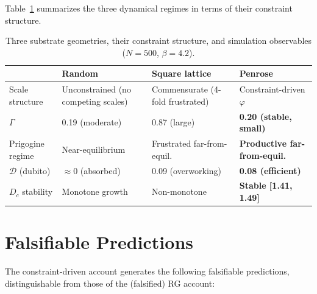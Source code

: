 \documentclass[11pt,a4paper]{article}
\theoremstyle{plain}
\theoremstyle{definition}
\newcommand{\phiGolden}{\varphi}
\begin{document}
Table~\ref{tab:regimes} summarizes the three dynamical regimes in terms
of their constraint structure.

\begin{table}[h]
\centering
\caption{Three substrate geometries, their constraint structure, and
  simulation observables ($N = 500$, $\beta = 4.2$).}
\label{tab:regimes}
\begin{tabular}{p{2.8cm}p{2.8cm}p{2.8cm}p{3.2cm}}
\toprule
& \textbf{Random} & \textbf{Square lattice} & \textbf{Penrose} \\
\midrule
Scale structure &
  Unconstrained (no competing scales) &
  Commensurate (4-fold frustrated) &
  Constraint-driven $\phiGolden$ \\[4pt]
$\Gamma$ & 0.19 (moderate) & 0.87 (large) & \textbf{0.20 (stable, small)} \\[4pt]
Prigogine regime &
  Near-equilibrium &
  Frustrated far-from-equil. &
  \textbf{Productive far-from-equil.} \\[4pt]
$\mathcal{D}$ (dubito) &
  $\approx 0$ (absorbed) &
  0.09 (overworking) &
  \textbf{0.08 (efficient)} \\[4pt]
$D_c$ stability &
  Monotone growth &
  Non-monotone &
  \textbf{Stable [1.41, 1.49]} \\
\bottomrule
\end{tabular}
\end{table}

\section{Falsifiable Predictions}
\label{sec:predictions}

The constraint-driven account generates the following falsifiable predictions,
distinguishable from those of the (falsified) RG account:
\end{document}
